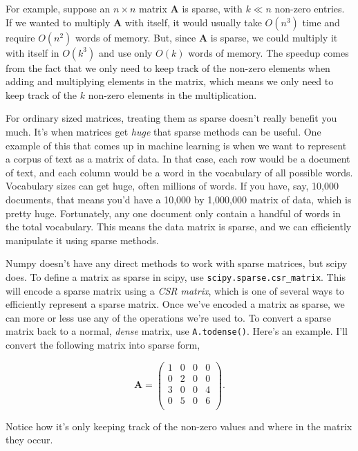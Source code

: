 \documentclass[
  letterpaper,
  DIV=11,
  numbers=noendperiod]{scrreprt}
\begin{document}
For example, suppose an \(n \times n\) matrix \(\mathbf{A}\) is sparse,
with \(k \ll n\) non-zero entries. If we wanted to multiply
\(\mathbf{A}\) with itself, it would usually take \(O(n^3)\) time and
require \(O(n^2)\) words of memory. But, since \(\mathbf{A}\) is sparse,
we could multiply it with itself in \(O(k^3)\) and use only \(O(k)\)
words of memory. The speedup comes from the fact that we only need to
keep track of the non-zero elements when adding and multiplying elements
in the matrix, which means we only need to keep track of the \(k\)
non-zero elements in the multiplication.

For ordinary sized matrices, treating them as sparse doesn't really
benefit you much. It's when matrices get \emph{huge} that sparse methods
can be useful. One example of this that comes up in machine learning is
when we want to represent a corpus of text as a matrix of data. In that
case, each row would be a document of text, and each column would be a
word in the vocabulary of all possible words. Vocabulary sizes can get
huge, often millions of words. If you have, say, 10,000 documents, that
means you'd have a 10,000 by 1,000,000 matrix of data, which is pretty
huge. Fortunately, any one document only contain a handful of words in
the total vocabulary. This means the data matrix is sparse, and we can
efficiently manipulate it using sparse methods.

Numpy doesn't have any direct methods to work with sparse matrices, but
scipy does. To define a matrix as sparse in scipy, use
\texttt{scipy.sparse.csr\_matrix}. This will encode a sparse matrix
using a \emph{CSR matrix}, which is one of several ways to efficiently
represent a sparse matrix. Once we've encoded a matrix as sparse, we can
more or less use any of the operations we're used to. To convert a
sparse matrix back to a normal, \emph{dense} matrix, use
\texttt{A.todense()}. Here's an example. I'll convert the following
matrix into sparse form,

\[
\mathbf{A} = 
\begin{pmatrix}
1 & 0 & 0 & 0 \\
0 & 2 & 0 & 0 \\
3 & 0 & 0 & 4 \\
0 & 5 & 0 & 6 \\
\end{pmatrix}.
\]

Notice how it's only keeping track of the non-zero values and where in
the matrix they occur.
\end{document}
